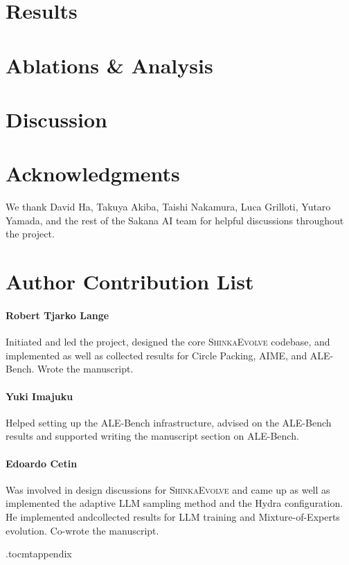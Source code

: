 \documentclass[11pt, a4paper]{include/gdm_format}
\newcommand{\ouralgo}{\textsc{ShinkaEvolve}\xspace}
\begin{document}


\newpage
\section{Results}
\label{sec:results}



\section{Ablations \& Analysis} 
\label{sec:ablations}


\section{Discussion}



\newpage
\section*{Acknowledgments}

We thank David Ha, Takuya Akiba, Taishi Nakamura, Luca Grilloti, Yutaro Yamada, and the rest of the Sakana AI team for helpful discussions throughout the project.

\section*{Author Contribution List}
\label{sec:author_contribution_list}

\paragraph{Robert Tjarko Lange} Initiated and led the project, designed the core \ouralgo codebase, and implemented as well as collected results for Circle Packing, AIME, and ALE-Bench. Wrote the manuscript.
\paragraph{Yuki Imajuku} Helped setting up the ALE-Bench infrastructure, advised on the ALE-Bench results and supported writing the manuscript section on ALE-Bench.
\paragraph{Edoardo Cetin} Was involved in design discussions for \ouralgo and came up as well as implemented the adaptive LLM sampling method and the Hydra configuration. He implemented andcollected results for LLM training and Mixture-of-Experts evolution. Co-wrote the manuscript.

\newpage



\clearpage
\appendix

\etocdepthtag.toc{mtappendix}
\renewcommand{\contentsname}{Appendix}
\tableofcontents

\newpage

\end{document}
